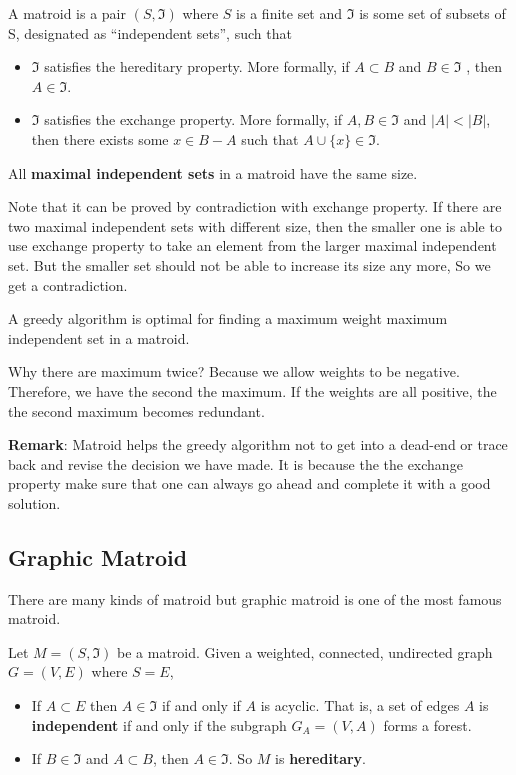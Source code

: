 \begin{definition}
A matroid is a pair $(S, \mathfrak{I})$ where $S$ is a finite set and $\mathfrak{I}$ is some set of subsets of S, designated as ``independent sets'', such that
\begin{itemize}
	\item $\mathfrak{I}$ satisfies the hereditary property. More formally, if $A \subset B$ and $ B \in \mathfrak{I} $ , then $ A \in \mathfrak{I} $.
	\item $\mathfrak{I}$ satisfies the exchange property. More formally, if $A, B \in \mathfrak{I}$ and $|A| < |B|$, then there exists some $x \in B - A$ such that $A \cup \{x\}\in \mathfrak{I}$.
\end{itemize}
\end{definition}
All \textbf{maximal independent sets} in a matroid have the same size. 

Note that it can be proved by contradiction with exchange property. If there are two maximal independent sets with different size, then the smaller one is able to use exchange property to take an element from the larger maximal independent set. But the smaller set should not be able to increase its size any more, So we get a contradiction.

A greedy algorithm is optimal for finding a maximum weight maximum independent set in a matroid. 

Why there are maximum twice? Because we allow weights to be negative. Therefore, we have the second the maximum. If the weights are all positive, the the second maximum becomes redundant.

\textbf{Remark}: Matroid helps the greedy algorithm not to get into a dead-end or trace back and revise the decision we have made. It is because the the exchange property make sure that one can always go ahead and complete it with a good solution.  
\subsection{Graphic Matroid}
There are many kinds of matroid but graphic matroid is one of the most famous matroid.
\begin{definition}
	Let $ M = (S, \mathfrak{I}) $ be a matroid. Given a weighted, connected, undirected graph $ G = (V , E) $ where $ S = E $,
	\begin{itemize}
		\item If $ A \subset E $ then $A \in \mathfrak{I}$ if and only if $ A $ is acyclic. That is, a set of edges $A$ is \textbf{independent} if and only if the subgraph $G_A = (V, A)$ forms a forest.
		\item If $ B \in \mathfrak{I} $ and $ A \subset B $, then $ A \in \mathfrak{I} $. So $ M $ is \textbf{hereditary}.
	\end{itemize}
\end{definition}

